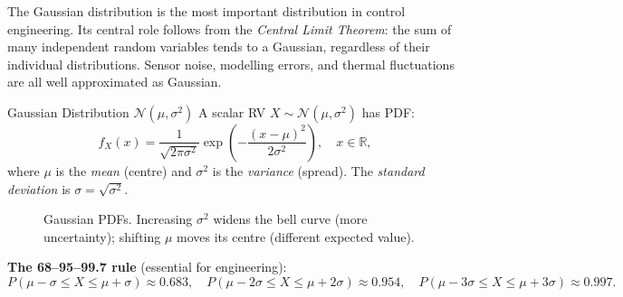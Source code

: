 The Gaussian distribution is the most important distribution in
control engineering.  Its central role follows from the
\emph{Central Limit Theorem}: the sum of many independent random
variables tends to a Gaussian, regardless of their individual
distributions.  Sensor noise, modelling errors, and thermal
fluctuations are all well approximated as Gaussian.

\begin{defnbox}{Gaussian Distribution $\mathcal{N}(\mu, \sigma^2)$}
A scalar RV $X \sim \mathcal{N}(\mu, \sigma^2)$ has PDF:
\[
  f_X(x) = \frac{1}{\sqrt{2\pi\sigma^2}}
            \exp\!\left(-\frac{(x-\mu)^2}{2\sigma^2}\right),
  \quad x \in \mathbb{R},
\]
where $\mu$ is the \emph{mean} (centre) and $\sigma^2$ is the
\emph{variance} (spread).  The \emph{standard deviation} is
$\sigma = \sqrt{\sigma^2}$.
\end{defnbox}

\begin{figure}[htbp]
\centering
{}
\caption{Gaussian PDFs.  Increasing $\sigma^2$ widens the bell curve
  (more uncertainty); shifting $\mu$ moves its centre (different
  expected value).}
\label{fig:gauss_pdf}
\end{figure}

\textbf{The 68--95--99.7 rule} (essential for engineering):
\[
  P(\mu - \sigma \leq X \leq \mu + \sigma)    \approx 0.683,\quad
  P(\mu - 2\sigma \leq X \leq \mu + 2\sigma)  \approx 0.954,\quad
  P(\mu - 3\sigma \leq X \leq \mu + 3\sigma)  \approx 0.997.
\]

